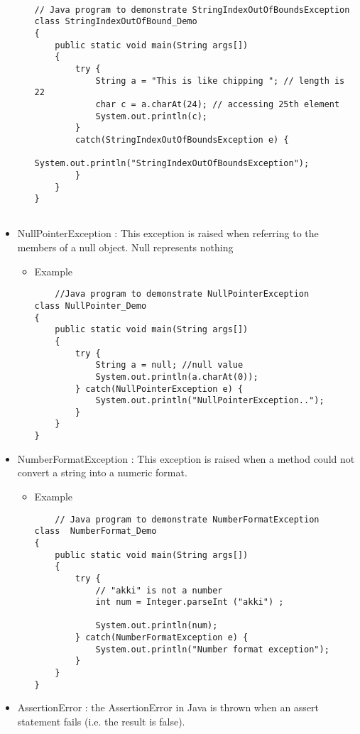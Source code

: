\documentclass{article}
\begin{document}
\begin{itemize}
\begin{itemize}
\begin{lstlisting}
        
// Java program to demonstrate StringIndexOutOfBoundsException 
class StringIndexOutOfBound_Demo 
{ 
    public static void main(String args[]) 
    { 
        try { 
            String a = "This is like chipping "; // length is 22 
            char c = a.charAt(24); // accessing 25th element 
            System.out.println(c); 
        } 
        catch(StringIndexOutOfBoundsException e) { 
            System.out.println("StringIndexOutOfBoundsException"); 
        } 
    } 
} 
        
        \end{lstlisting}
    \end{itemize}

\item NullPointerException : This exception is raised when referring to the members of a null object. Null represents nothing
\begin{itemize}
    \item Example
    \begin{lstlisting}
    //Java program to demonstrate NullPointerException 
class NullPointer_Demo 
{ 
    public static void main(String args[]) 
    { 
        try { 
            String a = null; //null value 
            System.out.println(a.charAt(0)); 
        } catch(NullPointerException e) { 
            System.out.println("NullPointerException.."); 
        } 
    } 
} 

    \end{lstlisting}
\end{itemize}

\item NumberFormatException : This exception is raised when a method could not convert a string into a numeric format.
\begin{itemize}
    \item Example
    \begin{lstlisting}
    // Java program to demonstrate NumberFormatException 
class  NumberFormat_Demo 
{ 
    public static void main(String args[]) 
    { 
        try { 
            // "akki" is not a number 
            int num = Integer.parseInt ("akki") ; 
  
            System.out.println(num); 
        } catch(NumberFormatException e) { 
            System.out.println("Number format exception"); 
        } 
    } 
} 
    \end{lstlisting}
\end{itemize}
\item AssertionError : the AssertionError in Java is thrown when an assert statement fails (i.e. the result is false).


\end{itemize}
\end{document}
